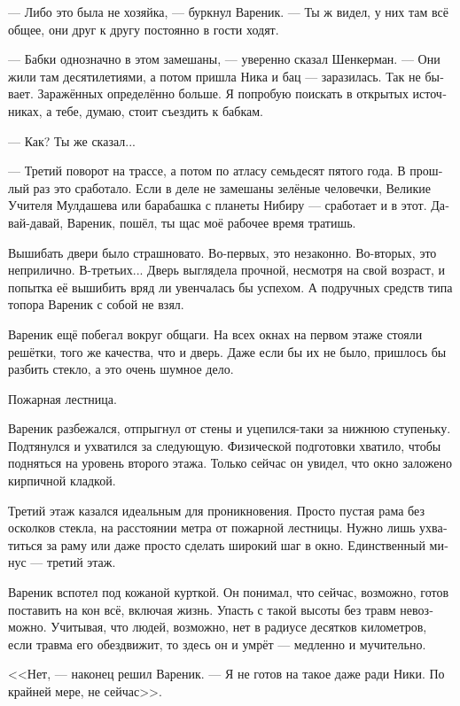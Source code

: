 \documentclass[a5paper,12pt,fleqn]{extbook}\usepackage{cooltooltips}\usepackage{polyglossia}\setdefaultlanguage[babelshorthands=true]{russian}\setotherlanguage{english}\defaultfontfeatures{Ligatures=TeX,Mapping=tex-text} \usepackage{xcolor}\definecolor{lightgray}{HTML}{bbbbbb}\color{lightgray}\newcommand{\ml}[3]{\textenglish{\textcolor{black}{#3}}}
\newcommand{\asterism}{\vspace{1em}{\centering\Large\bfseries$\ast~\ast~\ast$\par}\vspace{1em}}
\newcommand{\textspace}{\vspace{1em}{\centering\Large\bfseries<...>\par}\vspace{1em}}
\begin{document}
--- Либо это была не хозяйка, --- буркнул Вареник.
--- Ты ж видел, у них там всё общее, они друг к другу постоянно в гости ходят.

--- Бабки однозначно в этом замешаны, --- уверенно сказал Шенкерман.
--- Они жили там десятилетиями, а потом пришла Ника и бац --- заразилась.
Так не бывает.
Заражённых определённо больше.
Я попробую поискать в открытых источниках, а тебе, думаю, стоит съездить к бабкам.

--- Как?
Ты же сказал...

--- Третий поворот на трассе, а потом по атласу семьдесят пятого года.
В прошлый раз это сработало.
Если в деле не замешаны зелёные человечки, Великие Учителя Мулдашева или барабашка с планеты Нибиру --- сработает и в этот.
Давай-давай, Вареник, пошёл, ты щас моё рабочее время тратишь.

\asterism

\textspace

Вышибать двери было страшновато.
Во-первых, это незаконно.
Во-вторых, это неприлично.
В-третьих...
Дверь выглядела прочной, несмотря на свой возраст, и попытка её вышибить вряд ли увенчалась бы успехом.
А подручных средств типа топора Вареник с собой не взял.

Вареник ещё побегал вокруг общаги.
На всех окнах на первом этаже стояли решётки, того же качества, что и дверь.
Даже если бы их не было, пришлось бы разбить стекло, а это очень шумное дело.

Пожарная лестница.

Вареник разбежался, отпрыгнул от стены и уцепился-таки за нижнюю ступеньку.
Подтянулся и ухватился за следующую.
Физической подготовки хватило, чтобы подняться на уровень второго этажа.
Только сейчас он увидел, что окно заложено кирпичной кладкой.

Третий этаж казался идеальным для проникновения.
Просто пустая рама без осколков стекла, на расстоянии метра от пожарной лестницы.
Нужно лишь ухватиться за раму или даже просто сделать широкий шаг в окно.
Единственный минус --- третий этаж.

Вареник вспотел под кожаной курткой.
Он понимал, что сейчас, возможно, готов поставить на кон всё, включая жизнь.
Упасть с такой высоты без травм невозможно.
Учитывая, что людей, возможно, нет в радиусе десятков километров, если травма его обездвижит, то здесь он и умрёт --- медленно и мучительно.

<<Нет, --- наконец решил Вареник.
--- Я не готов на такое даже ради Ники.
По крайней мере, не сейчас>>.
\end{document}
